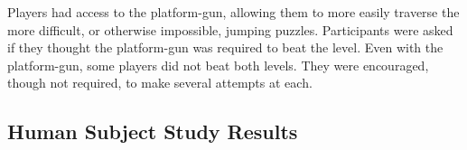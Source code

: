 


Players had access to the platform-gun, allowing them to more easily traverse the more difficult, or otherwise impossible, jumping puzzles. Participants were asked if they thought the platform-gun was required to beat the level. Even with the platform-gun, some players did not beat both levels. They were encouraged, though not required, to make several attempts at each.








\subsection{Human Subject Study Results}


